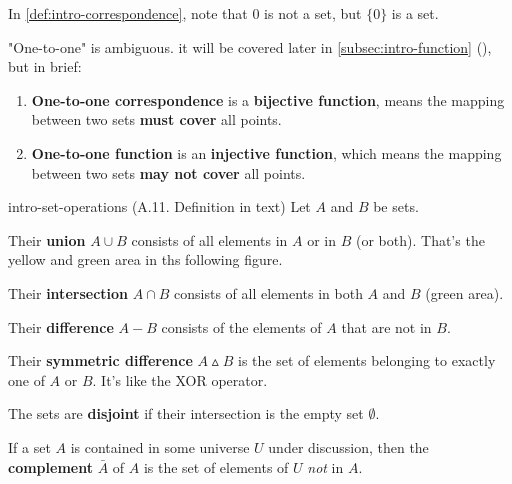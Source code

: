 \documentclass[../src/handouts/main.tex]{subfiles}
\begin{document}
In \cref{def:intro-correspondence}, note that 0 is not a set, but $\{ 0 \}$ is a set.

"One-to-one" is ambiguous. it will be covered later in \cref{subsec:intro-function} (), but in brief:
\begin{enumerate}
  \item \textbf{One-to-one correspondence} is a \textbf{bijective function}, means the mapping between two sets \textbf{must cover} all points.
  \item \textbf{One-to-one function} is an \textbf{injective function}, which means the mapping between two sets \textbf{may not cover} all points.
\end{enumerate}

\begin{definition}{}{intro-set-operations}
  (A.11. Definition in text)
  Let $A$ and $B$ be sets.

  Their \textbf{union} $A \cup B$ consists of all elements in $A$ or in $B$ (or both). That's the yellow and green area in ths following figure.

  Their \textbf{intersection} $A \cap B$ consists of all elements in both $A$ and $B$ (green area).

  Their \textbf{difference} $A - B$ consists of the elements of $A$ that are not in $B$.

  Their \textbf{symmetric difference} $A \smalltriangleup B$ is the set of elements belonging to exactly one of $A$ or $B$. It's like the XOR operator.

  The sets are \textbf{disjoint} if their intersection is the empty set $\emptyset$.

  If a set $A$ is contained in some universe $U$ under discussion, then the \textbf{complement} $\bar A$ of $A$ is the set of elements of $U$ \textit{not} in $A$.

  \centering
\end{definition}
\end{document}
